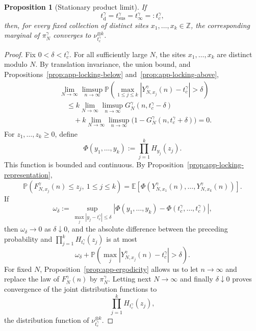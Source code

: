 \documentclass[11pt,a4paper]{amsart}
\newtheorem{proposition}[theorem]{Proposition}
\theoremstyle{remark}
\newcommand{\Z}{\mathbb Z}
\begin{document}
\begin{proposition}[Stationary product limit]
\label{prop:app-stationary-limit}
If
\[
        t_{\mathrm d}^\gamma
        =t_{\mathrm{sus}}^\gamma
        =t_\infty^\gamma
        =:t_c^\gamma,
\]
then, for every fixed collection of distinct sites
$x_1,\ldots,x_k\in\Z$, the corresponding marginal of $\pi_N^\gamma$
converges to $\nu_{t_c^\gamma}^{\otimes k}$.
\end{proposition}

\begin{proof}
Fix $0<\delta<t_c^\gamma$. For all sufficiently large $N$, the sites
$x_1,\ldots,x_k$ are distinct modulo $N$. By translation invariance, the
union bound, and Propositions~\ref{prop:app-locking-below}
and~\ref{prop:app-locking-above},
\begin{align*}
&\lim_{N\to\infty}\limsup_{n\to\infty}
\mathbb{P}\left(
\max_{1\leq j\leq k}
|Y_{N,x_j}^\gamma(n)-t_c^\gamma|>\delta
\right)\\
&\quad\leq
k\lim_{N\to\infty}\limsup_{n\to\infty}
G_N^\gamma(n,t_c^\gamma-\delta)\\
&\qquad+
k\lim_{N\to\infty}\limsup_{n\to\infty}
\bigl(1-G_N^\gamma(n,t_c^\gamma+\delta)\bigr)=0.
\end{align*}
For $z_1,\ldots,z_k\geq0$, define
\[
        \Phi(y_1,\ldots,y_k)
        :=
        \prod_{j=1}^kH_{y_j}(z_j).
\]
This function is bounded and continuous. By
Proposition~\ref{prop:app-locking-representation},
\[
        \mathbb{P}(F_{N,x_j}^\gamma(n)\leq z_j,\ 1\leq j\leq k)
        =
        \mathbb{E}[
        \Phi(Y_{N,x_1}^\gamma(n),\ldots,Y_{N,x_k}^\gamma(n))
        ].
\]
If
\[
        \omega_\delta
        :=
        \sup_{\max_j|y_j-t_c^\gamma|\leq\delta}
        |
        \Phi(y_1,\ldots,y_k)
        -\Phi(t_c^\gamma,\ldots,t_c^\gamma)
        |,
\]
then $\omega_\delta\to0$ as $\delta\downarrow0$, and the absolute
difference between the preceding probability and
$\prod_{j=1}^kH_{t_c^\gamma}(z_j)$ is at most
\[
        \omega_\delta+
        \mathbb{P}\left(
        \max_j|Y_{N,x_j}^\gamma(n)-t_c^\gamma|>\delta
        \right).
\]
For fixed $N$, Proposition~\ref{prop:app-ergodicity} allows us to let
$n\to\infty$ and replace the law of $F_N^\gamma(n)$ by
$\pi_N^\gamma$. Letting next $N\to\infty$ and finally
$\delta\downarrow0$ proves convergence of the joint distribution
functions to
\[
        \prod_{j=1}^kH_{t_c^\gamma}(z_j),
\]
the distribution function of $\nu_{t_c^\gamma}^{\otimes k}$.
\end{proof}
\end{document}
